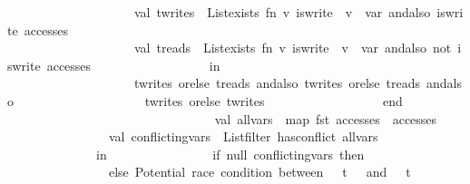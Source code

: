\begin{isabellebody}
\ \ \ \ \ \ \ \ \ \ \ \ \ \ \ \ \ \ \ \ val\ t{}{\isacharunderscore}{\kern0pt}writes\ {\isacharequal}{\kern0pt}\ List{\isachardot}{\kern0pt}exists\ {\isacharparenleft}{\kern0pt}fn\ {\isacharparenleft}{\kern0pt}v{\isacharcomma}{\kern0pt}\ is{\isacharunderscore}{\kern0pt}write{\isacharparenright}{\kern0pt}\ {\isacharequal}{\kern0pt}{\isachargreater}{\kern0pt}\ v\ {\isacharequal}{\kern0pt}\ var\ andalso\ is{\isacharunderscore}{\kern0pt}write{\isacharparenright}{\kern0pt}\ accesses{}\isanewline
\ \ \ \ \ \ \ \ \ \ \ \ \ \ \ \ \ \ \ \ val\ t{}{\isacharunderscore}{\kern0pt}reads\ {\isacharequal}{\kern0pt}\ List{\isachardot}{\kern0pt}exists\ {\isacharparenleft}{\kern0pt}fn\ {\isacharparenleft}{\kern0pt}v{\isacharcomma}{\kern0pt}\ is{\isacharunderscore}{\kern0pt}write{\isacharparenright}{\kern0pt}\ {\isacharequal}{\kern0pt}{\isachargreater}{\kern0pt}\ v\ {\isacharequal}{\kern0pt}\ var\ andalso\ not\ is{\isacharunderscore}{\kern0pt}write{\isacharparenright}{\kern0pt}\ accesses{}\isanewline
\ \ \ \ \ \ \ \ \ \ \ \ \ \ \ \ \ \ in\isanewline
\ \ \ \ \ \ \ \ \ \ \ \ \ \ \ \ \ \ \ \ {\isacharparenleft}{\kern0pt}t{}{\isacharunderscore}{\kern0pt}writes\ orelse\ t{}{\isacharunderscore}{\kern0pt}reads{\isacharparenright}{\kern0pt}\ andalso\ {\isacharparenleft}{\kern0pt}t{}{\isacharunderscore}{\kern0pt}writes\ orelse\ t{}{\isacharunderscore}{\kern0pt}reads{\isacharparenright}{\kern0pt}\ andalso\isanewline
\ \ \ \ \ \ \ \ \ \ \ \ \ \ \ \ \ \ \ \ {\isacharparenleft}{\kern0pt}t{}{\isacharunderscore}{\kern0pt}writes\ orelse\ t{}{\isacharunderscore}{\kern0pt}writes{\isacharparenright}{\kern0pt}\isanewline
\ \ \ \ \ \ \ \ \ \ \ \ \ \ \ \ \ \ end\isanewline
\ \ \ \ \ \ \ \ \ \ \ \ \ \ \ \ \isanewline
\ \ \ \ \ \ \ \ \ \ \ \ \ \ \ \ val\ all{\isacharunderscore}{\kern0pt}vars\ {\isacharequal}{\kern0pt}\ map\ fst\ {\isacharparenleft}{\kern0pt}accesses{}\ {\isacharat}{\kern0pt}\ accesses{}{\isacharparenright}{\kern0pt}\isanewline
\ \ \ \ \ \ \ \ \ \ \ \ \ \ \ \ val\ conflicting{\isacharunderscore}{\kern0pt}vars\ {\isacharequal}{\kern0pt}\ List{\isachardot}{\kern0pt}filter\ has{\isacharunderscore}{\kern0pt}conflict\ all{\isacharunderscore}{\kern0pt}vars\isanewline
\ \ \ \ \ \ \ \ \ \ \ \ \ \ in\isanewline
\ \ \ \ \ \ \ \ \ \ \ \ \ \ \ \ if\ null\ conflicting{\isacharunderscore}{\kern0pt}vars\ then\ {\isacharbrackleft}{\kern0pt}{\isacharbrackright}{\kern0pt}\isanewline
\ \ \ \ \ \ \ \ \ \ \ \ \ \ \ \ else\ {\isacharbrackleft}{\kern0pt}{\isachardoublequote}{\kern0pt}Potential\ race\ condition\ between\ {\isachardoublequote}{\kern0pt}\ {\isacharcircum}{\kern0pt}\ t{}\ {\isacharcircum}{\kern0pt}\ {\isachardoublequote}{\kern0pt}\ and\ {\isachardoublequote}{\kern0pt}\ {\isacharcircum}{\kern0pt}\ t{}\ {\isacharcircum}{\kern0pt}\ \isanewline

\end{isabellebody}
